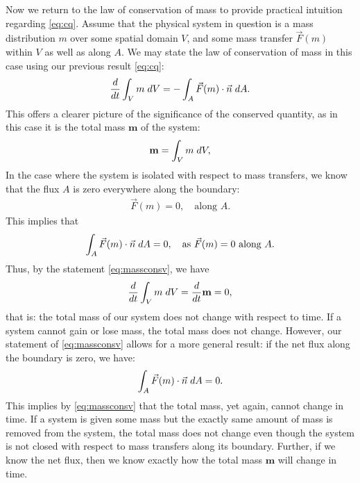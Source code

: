 \documentclass[12pt,a4]{article}
\begin{document}
\noindent Now we return to the law of conservation of mass to provide practical intuition regarding \ref{eq:cq}. Assume that the physical system in question is a mass distribution $m$ over some spatial domain $V$, and some mass transfer $\vec F(m)$ within $V$ as well as along $A$. We may state the law of conservation of mass in this case using our previous result \ref{eq:cq}:
\begin{gather}\label{eq:massconsv}
    \frac{d}{dt} \int_V m\hspace*{0.10 cm} dV = - \int_A \vec F(m) \cdot \vec n \hspace*{0.10 cm}dA.
\end{gather}
This offers a clearer picture of the significance of the conserved quantity, as in this case it is the total mass $\mathbf{m}$ of the system:
\begin{gather*}
    \mathbf{m} = \int_V m \hspace*{0.10 cm }dV,
\end{gather*}
In the case where the system is isolated with respect to mass transfers, we know that the flux $A$ is zero everywhere along the boundary:
\begin{gather*}
    \vec F(m) = 0,\quad\text{along } A.
\end{gather*}
This implies that
\begin{gather*}
    \int_A \vec F(m) \cdot \vec n \hspace*{0.10 cm}dA = 0,\quad\text{as } \vec F(m) = 0\text{ along } A.\\
\end{gather*}
Thus, by the statement \ref{eq:massconsv}, we have
\begin{gather*}
    \frac{d}{dt}\int_V m\hspace*{0.10 cm} dV = \frac{d}{dt}\mathbf{m} = 0,
\end{gather*}
that is: the total mass of our system does not change with respect to time. If a system cannot gain or lose mass, the total mass does not change. However, our statement of \ref{eq:massconsv} allows for a more general result: if the net flux along the boundary is zero, we have:
\begin{gather*}
    \int_A \vec F(m) \cdot \vec n \hspace*{0.10 cm}dA = 0.
\end{gather*}
This implies by \ref{eq:massconsv} that the total mass, yet again, cannot change in time. If a system is given some mass but the exactly same amount of mass is removed from the system, the total mass does not change even though the system is not closed with respect to mass transfers along its boundary. Further, if we know the net flux, then we know exactly how the total mass $\mathbf{m}$ will change in time.
\end{document}
